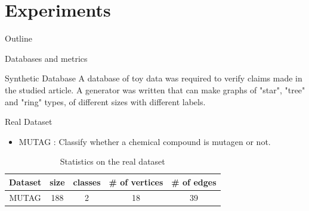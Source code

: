 \documentclass[compress]{beamer}
\DeclarePairedDelimiter{\abs}{\lvert}{\rvert}
\let\vec\mathbf
\begin{document}
\section{Experiments}
\begin{frame}{Outline}
  \tableofcontents[currentsection]
\end{frame}
\begin{frame}{Databases and metrics}
    \begin{block}{Synthetic Database}
    	A database of toy data was required to verify claims made in the studied article. A generator was written that can make graphs of "star", "tree" and "ring" types, of different sizes with different labels.
    \end{block}
	\pause
	\begin{block}{Real Dataset}
		\begin{itemize}
			\item MUTAG : Classify whether a chemical compound is mutagen or not.
		\end{itemize}
	\begin{table}[!htb]
	\begin{center}
		\begin{tabular}{|c|c|c|c|c|}
			\hline
			Dataset & size & classes & \# of vertices & \# of edges\\
			\hline
			MUTAG & 188 & 2 & 18 & 39\\
			\hline
		\end{tabular}
	\end{center}
	\caption*{Statistics on the real dataset}
	\label{tab:stats_real}
	\end{table}
	\end{block}
\end{frame}
\end{document}
